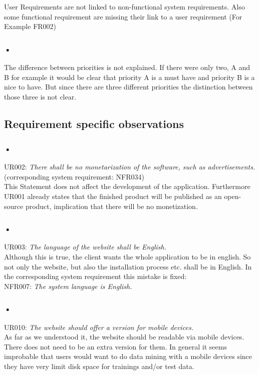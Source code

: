 \documentclass{article}
\begin{document}
\subsubsection{}
User Requirements are not linked to non-functional system requirements. Also some functional requirement are missing their link to a user requirement (For Example FR002)
\subsubsection{•}
The difference between priorities is not explained. If there were only two, A and B for example it would be clear that priority A is a must have and priority B is a nice to have. But since there are three different priorities the distinction between those three is not clear.

\subsection{Requirement specific observations}
 
\subsubsection{•}
UR002: \textit{There shall be no monetarization of the software, such as advertisements.} (corresponding system requirement: NFR034)\\
This Statement does not affect the development of the application. Furthermore UR001 already states that the finished product will be published as an open-source product, implication that there will be no monetization.

\subsubsection{•}
UR003: \textit{The language of the website shall be English.} \\
Although this is true, the client wants the whole application to be in english. So not only the website, but also the installation process etc. shall be in English. In the corresponding system requirement this mistake is fixed:\\ 
NFR007: \textit{The system language is English.}
 
\subsubsection{•}
UR010: \textit{The website should offer a version for mobile devices.} \\
As far as we understood it, the website should be readable via mobile devices. There does not need to be an extra version for them. In general it seems improbable that users would want to do data mining with a mobile devices since they have very limit disk space for trainings and/or test data.
 
\end{document}
